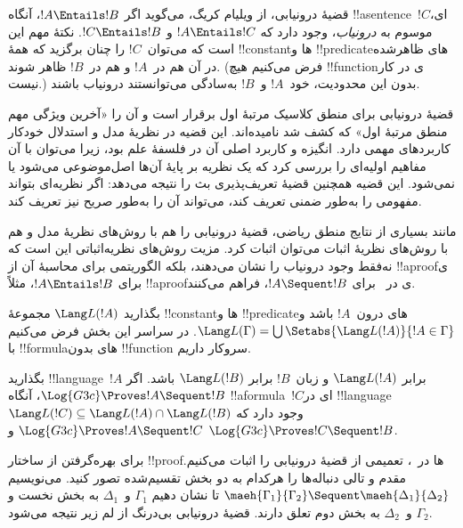 \documentclass[../../../include/open-logic-section]{subfiles}
\begin{document}


قضیهٔ درونیابی، از ویلیام کریگ، می‌گوید اگر $!A\Entails !B$، آنگاه
!!a{sentence}~$!C$ای، موسوم به \emph{درونیاب}، وجود دارد که
$!A\Entails !C$ و $!C\Entails !B$. نکتهٔ مهم این است که می‌توان~$!C$
را چنان برگزید که همهٔ !!{constant}ها و !!{predicate}های ظاهرشده در
آن هم در~$!A$ و هم در~$!B$ ظاهر شوند. (فرض می‌کنیم هیچ !!{function}ی
در کار نیست.) بدون این محدودیت، خود~$!A$ و~$!B$ به‌سادگی می‌توانستند
درونیاب باشند.

قضیهٔ درونیابی برای منطق کلاسیک مرتبهٔ اول برقرار است و آن را
«آخرین ویژگی مهم منطق مرتبهٔ اول» که کشف شد نامیده‌اند. این قضیه در
نظریهٔ مدل و استدلال خودکار کاربردهای مهمی دارد. انگیزه و کاربرد اصلی
آن در فلسفهٔ علم بود، زیرا می‌توان با آن مفاهیم اولیه‌ای را بررسی کرد
که یک نظریه بر پایهٔ آن‌ها اصل‌موضوعی می‌شود یا نمی‌شود. این قضیه
همچنین قضیهٔ تعریف‌پذیری بث را نتیجه می‌دهد: اگر نظریه‌ای بتواند
مفهومی را به‌طور ضمنی تعریف کند، می‌تواند آن را به‌طور صریح نیز تعریف
کند.

مانند بسیاری از نتایج منطق ریاضی، قضیهٔ درونیابی را هم با روش‌های
نظریهٔ مدل و هم با روش‌های نظریهٔ اثبات می‌توان اثبات کرد. مزیت
روش‌های نظریه‌اثباتی این است که نه‌فقط وجود درونیاب را نشان می‌دهند،
بلکه الگوریتمی برای محاسبهٔ آن از !!a{proof}ی برای
$!A\Entails !B$، مثلاً !!a{proof}ی در~ برای
$!A\Sequent !B$، فراهم می‌کنند.

بگذارید $\Lang L(!A)$ مجموعهٔ !!{constant}ها و !!{predicate}های
درون~$!A$ باشد و
$\Lang L(\Gamma)=\bigcup\Setabs{\Lang L(!A)}{!A\in\Gamma}$.
در سراسر این بخش فرض می‌کنیم با !!{formula}های بدون !!{function}
سروکار داریم.

\begin{thm}
بگذارید !!{language}~$!A$ برابر $\Lang L(!A)$ و زبان~$!B$ برابر
$\Lang L(!B)$ باشد. اگر $\Log{G3c}\Proves !A\Sequent !B$، آنگاه
!!a{formula}~$!C$ای در !!{language}
$\Lang L(!C)\subseteq\Lang L(!A)\cap\Lang L(!B)$ وجود دارد که
$\Log{G3c}\Proves !A\Sequent !C$ و
$\Log{G3c}\Proves !C\Sequent !B$.
\end{thm}

برای بهره‌گرفتن از ساختار !!{proof}ها در~، تعمیمی از قضیهٔ
درونیابی را اثبات می‌کنیم. مقدم و تالی دنباله‌ها را هرکدام به دو بخش
تقسیم‌شده تصور کنید. می‌نویسیم
$\maeh{\Gamma_1}{\Gamma_2}\Sequent
\maeh{\Delta_1}{\Delta_2}$ تا نشان دهیم $\Gamma_1$ و~$\Delta_1$ به
بخش نخست و $\Gamma_2$ و~$\Delta_2$ به بخش دوم تعلق دارند. قضیهٔ
درونیابی بی‌درنگ از لم زیر نتیجه می‌شود.
\end{document}
